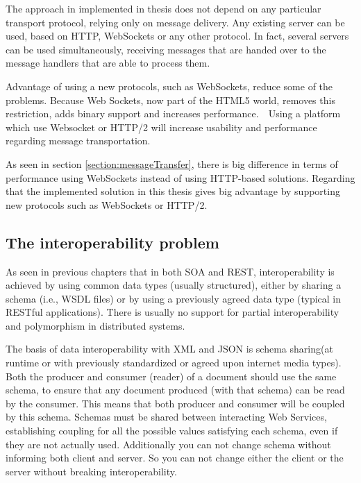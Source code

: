 The approach in implemented in thesis does not depend on any particular transport protocol, relying only on message delivery. Any existing server can be used, based on HTTP, WebSockets or any other protocol. In fact, several servers can be used simultaneously, receiving messages that are handed over to the message handlers that are able to process them.

Advantage of using a new protocols, such as WebSockets, reduce some of the problems. Because Web Sockets, now part of the HTML5 world, removes this restriction, adds binary support and increases performance.   Using a platform which use Websocket or HTTP/2 will increase usability and performance regarding message transportation.

As seen in section \ref{section:messageTransfer}, there is big difference in terms of performance using WebSockets instead of using HTTP-based solutions. Regarding that the implemented solution in this thesis gives big advantage by supporting new protocols such as WebSockets or HTTP/2.

\subsection{The interoperability problem}
\label{section:interoperabilityProblem}

As seen in previous chapters that in both SOA and REST, interoperability is achieved by using common data types (usually structured), either by sharing a schema (i.e., WSDL files) or by using a previously agreed data type (typical in RESTful applications). There is usually no support for partial interoperability and polymorphism in distributed systems.

The basis of data interoperability with XML and JSON is schema sharing(at runtime or with previously standardized or agreed upon internet media types). Both the producer and consumer (reader) of a document should use the same schema, to ensure that any document produced (with that schema) can be read by the consumer. This means that both producer and consumer will be coupled by this schema. Schemas must be shared between interacting Web Services, establishing coupling for all the possible values satisfying each schema, even if they are not actually used. Additionally you can not change schema without informing both client and server. So you can not change either the client or the server without breaking interoperability.

